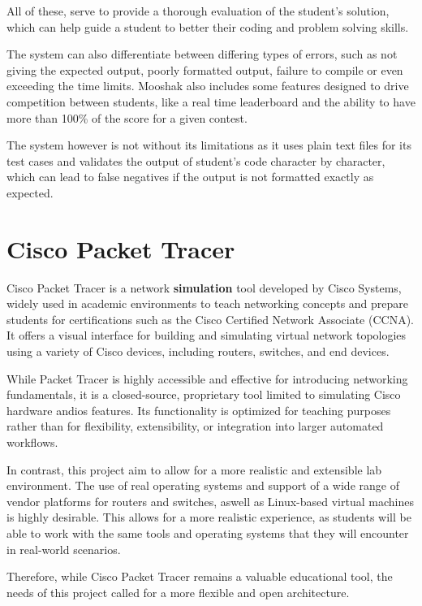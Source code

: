         All of these, serve to provide a thorough evaluation of the student's solution, which can help guide a student to better
        their coding and problem solving skills.

        The system can also differentiate between differing types of errors, such as not giving the expected output, poorly 
        formatted output, failure to compile or even exceeding the time limits.
        Mooshak also includes some features designed to drive competition between students, like a real time leaderboard and
        the ability to have more than 100\% of the score for a given contest.

        The system however is not without its limitations as it uses plain text files for its test cases and validates the output 
        of student's code character by character, which can lead to false negatives if the output is not formatted exactly as
        expected.

\section{Cisco Packet Tracer}

    Cisco Packet Tracer is a network \textbf{simulation} tool developed by Cisco Systems, widely used in academic environments 
    to teach networking concepts and prepare students for certifications such as the Cisco Certified Network Associate (CCNA). 
    It offers a visual interface for building and simulating virtual network topologies using a variety of Cisco devices, 
    including routers, switches, and end devices.

    While Packet Tracer is highly accessible and effective for introducing networking fundamentals, it is a closed-source, 
    proprietary tool limited to simulating Cisco hardware and\ac{ios} features. Its functionality is optimized for teaching 
    purposes rather than for flexibility, extensibility, or integration into larger automated workflows.

    In contrast, this project aim to allow for a more realistic and extensible lab environment. The use of real operating 
    systems and support of a wide range of vendor platforms for routers and switches, aswell as Linux-based virtual machines 
    is highly desirable. This allows for a more realistic experience, as students will be able to work with the same tools and 
    operating systems that they will encounter in real-world scenarios.

    Therefore, while Cisco Packet Tracer remains a valuable educational tool, the needs of this project called for a more 
    flexible and open architecture.